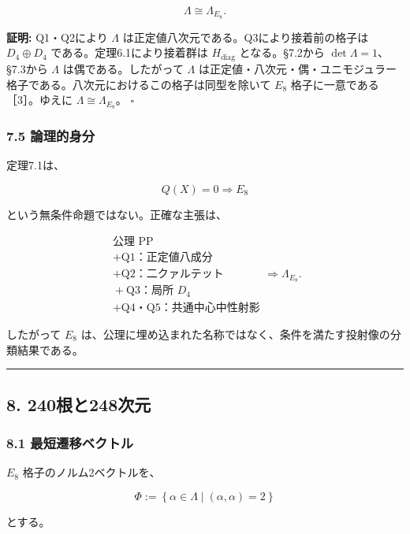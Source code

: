 \documentclass[
  a4paper,
  ja=minimal,
  xelatex,
  paragraph-mark={},
]{bxjsarticle}
\begin{document}
\[
\boxed{
\Lambda
\cong
\Lambda_{E_8}.
}
\]

\textbf{証明:} Q1・Q2により \(\Lambda\)
は正定値八次元である。Q3により接着前の格子は \(D_4\oplus D_4\)
である。定理6.1により接着群は \(H_{\mathrm{diag}}\) となる。§7.2から
\(\det\Lambda=1\)、§7.3から \(\Lambda\) は偶である。したがって
\(\Lambda\)
は正定値・八次元・偶・ユニモジュラー格子である。八次元におけるこの格子は同型を除いて
\(E_8\) 格子に一意である［3］。ゆえに \(\Lambda\cong\Lambda_{E_8}\)。
\(\square\)

\subsubsection{7.5 論理的身分}\label{ux8ad6ux7406ux7684ux8eabux5206}

定理7.1は、

\[
Q(X)=0
\Longrightarrow
E_8
\]

という無条件命題ではない。正確な主張は、

\[
\boxed{
\begin{array}{c}
\text{公理 PP}\\
{}+\text{Q1：正定値八成分}\\
{}+\text{Q2：二クァルテット}\\
{}+\text{Q3：局所 }D_4\\
{}+\text{Q4・Q5：共通中心中性射影}
\end{array}
\Longrightarrow
\Lambda_{E_8}.
}
\]

したがって \(E_8\)
は、公理に埋め込まれた名称ではなく、条件を満たす投射像の分類結果である。

\begin{center}\rule{0.5\linewidth}{0.5pt}\end{center}

\subsection{8. 240根と248次元}\label{ux6839ux3068248ux6b21ux5143}

\subsubsection{8.1
最短遷移ベクトル}\label{ux6700ux77edux9077ux79fbux30d9ux30afux30c8ux30eb}

\(E_8\) 格子のノルム2ベクトルを、

\[
\Phi
:=
\left\{
\alpha\in\Lambda
\mid
(\alpha,\alpha)=2
\right\}
\]

とする。
\end{document}
